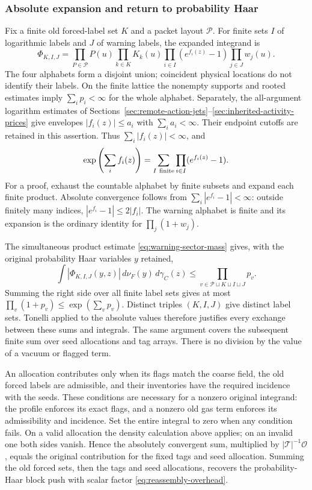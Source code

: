 \subsubsection{Absolute expansion and return to probability Haar}
Fix a finite old forced-label set $K$ and a packet layout $\mathcal P$.
For finite sets $I$ of logarithmic labels and $J$ of warning labels,
the expanded integrand is
\begin{equation}\label{eq:reassembly-molecule}
 \Phi_{K,I,J}
  =\prod_{P\in\mathcal P}P(u)\prod_{k\in K}K_k(u)
       \prod_{i\in I}(e^{f_i(z)}-1)\prod_{j\in J}w_j(u).
\end{equation}
The four alphabets form a disjoint union; coincident physical locations
do not identify their labels. On the finite lattice the nonempty
supports and rooted estimates imply $\sum_i p_i<\infty$ for the
whole alphabet. Separately, the all-argument logarithm estimates of
Sections~\ref{sec:remote-action-jets}--\ref{sec:inherited-activity-prices}
give envelopes $|f_i(z)|\le a_i$ with $\sum_i a_i<\infty$. Their
endpoint cutoffs are retained in this assertion. Thus
$\sum_i|f_i(z)|<\infty$, and
\[
 \exp\left(\sum_i f_i(z)\right)
                  =\sum_{I\ {\rm finite}}\prod_{i\in I}(e^{f_i(z)}-1).
\]
For a proof, exhaust the countable alphabet by finite subsets and
expand each finite product. Absolute convergence follows from
$\sum_i|e^{f_i}-1|<\infty$: outside finitely many indices,
$|e^{f_i}-1|\le2|f_i|$. The warning alphabet is finite and its
expansion is the ordinary identity for $\prod_j(1+w_j)$.

The simultaneous product estimate \eqref{eq:warning-sector-mass}
gives, with the original probability
Haar variables $y$ retained,
\[
 \int|\Phi_{K,I,J}(y,z)|\,d\nu_F(y)\,d\gamma_C(z)
                         \le\prod_{v\in\mathcal P\sqcup K\sqcup I\sqcup J}p_v.
\]
Summing the right side over all finite label sets gives at most
$\prod_v(1+p_v)\le\exp(\sum_vp_v)$. Distinct triples $(K,I,J)$
give distinct label sets. Tonelli applied to the absolute values
therefore justifies every exchange between these sums and integrals.
The same argument covers the subsequent finite sum over seed
allocations and tag arrays. There is no division by the value of a
vacuum or flagged term.

An allocation contributes only when its flags match the coarse field,
the old forced labels are admissible, and their inventories have the
required incidence with the seeds. These conditions are necessary for
a nonzero original integrand: the profile enforces its exact flags,
and a nonzero old gas term enforces its admissibility and incidence.
Set the entire integral to zero when any condition fails. On a valid
allocation the density calculation above applies; on an invalid one
both sides vanish. Hence the absolutely convergent sum, multiplied by
$|\mathcal T|^{-1}\mathscr O$, equals the original contribution for
the fixed tags and seed allocation. Summing the old forced sets,
then the tags and seed allocations, recovers the probability-Haar
block push with scalar factor \eqref{eq:reassembly-overhead}.

